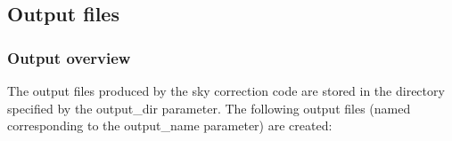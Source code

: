 \subsection{Output files}\label{sec:output}
\subsubsection{Output overview}
The output files produced by the sky correction code are stored in the
directory specified by the {\sc output\_dir} parameter. The following output
files (named corresponding to the {\sc output\_name} parameter) are created:
